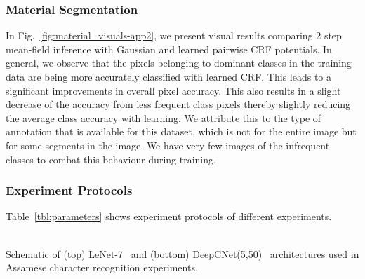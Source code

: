 \subsubsection{Material Segmentation}\label{sec:app_material_segmentation}
\label{sec:material_bnn_extra}

In Fig.~\ref{fig:material_visuals-app2}, we present visual results comparing 2 step
mean-field inference with Gaussian and learned pairwise CRF potentials. In
general, we observe that the pixels belonging to dominant classes in the
training data are being more accurately classified with learned CRF. This leads to
a significant improvements in overall pixel accuracy. This also results
in a slight decrease of the accuracy from less frequent class pixels thereby
slightly reducing the average class accuracy with learning. We attribute this
to the type of annotation that is available for this dataset, which is not
for the entire image but for some segments in the image. We have very few
images of the infrequent classes to combat this behaviour during training.

\subsubsection{Experiment Protocols}
\label{sec:protocols}

Table~\ref{tbl:parameters} shows experiment protocols of different experiments.

 \begin{figure*}[t!]
  \centering
  \\
  {Schematic of (top) LeNet-7~\cite{lecun1998mnist} and (bottom) DeepCNet(5,50)~\cite{ciresan2012multi,graham2014spatially} architectures used in Assamese
  character recognition experiments.}
\label{fig:nnrecognition}
\end{figure*}



